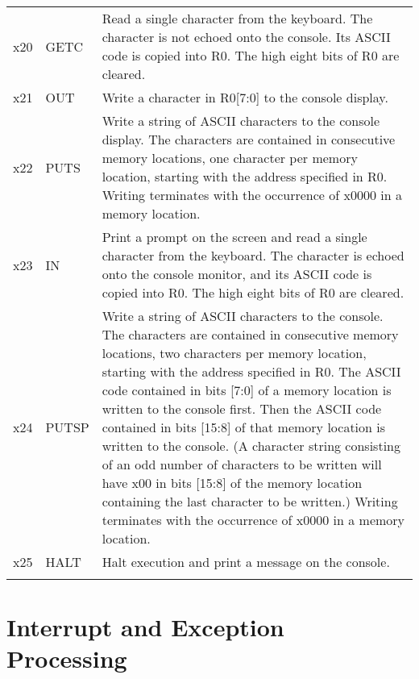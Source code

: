 \documentclass{patt}
\begin{document}
\newpage

\renewcommand{\thefootnote}{\arabic{footnote}}

\begin{table}[t]
{\begin{tabular}{@{\hspace{6pt}\extracolsep{\fill}}llP{24pc}@{}}
 &  & \\
\midrule
x20 & GETC & Read a single character from the
keyboard. The character is not echoed onto
the console. Its ASCII code is copied into
 R0. The high eight bits of R0 are cleared.\\
x21 & OUT & Write a character in R0[7:0] to the console display.\\
x22 & PUTS & Write a string of ASCII characters to the console display.
 The characters
 are contained in consecutive memory locations, one character per
 memory location, starting with the address specified in R0.
 Writing terminates with the occurrence of x0000 in a memory
 location.\\
x23 & IN & Print a prompt on the screen and read a single character from
 the keyboard. The character is echoed onto the console monitor,
 and its
 ASCII code is copied into R0. The high eight bits of R0 are
         cleared.\\
x24 & PUTSP & Write a string of ASCII characters to the console. The characters
 are contained in consecutive memory locations, two characters per
 memory location, starting with the address specified in R0.
 The ASCII code contained in bits [7:0] of a memory location
 is written to the console first. Then the ASCII code contained
 in bits [15:8] of that memory location is written to the
 console. (A character string consisting of an odd number of
 characters to be written will have x00 in bits [15:8] of the
 memory location containing the last character to be written.)
 Writing terminates with the occurrence of x0000 in a memory
 location.\\
x25 & HALT & Halt execution and print a message on the console. \\
\botrule
\end{tabular}}{}
\label{tab:trap}
 \vspace{12pt}
\end{table}



\section{Interrupt and Exception Processing}
\end{document}
